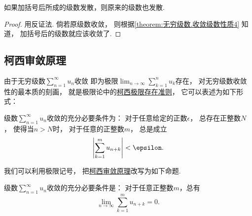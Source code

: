 \begin{corollary}
如果加括号后所成的级数发散，则原来的级数也发散.
\begin{proof}
用反证法.
倘若原级数收敛，
则根据\cref{theorem:无穷级数.收敛级数性质4} 知道，
加括号后的级数就应该收敛了.
\end{proof}
\end{corollary}

\subsection{柯西审敛原理}
由于无穷级数\(\sum_{n=1}^\infty u_n\)收敛
即为极限\(\lim_{n\to\infty} \sum_{k=1}^n u_k\)存在，
对无穷级数收敛性的最本质的刻画，
就是极限论中的\hyperref[theorem:极限.函数的柯西极限存在准则]{柯西极限存在准则}，
它可以表述为如下形式：
\begin{theorem}[柯西审敛原理]\label{theorem:无穷级数.级数的柯西审敛原理}
级数\(\sum_{n=1}^\infty u_n\)收敛的充分必要条件为：
对于任意给定的正数\(\epsilon\)，
总存在正整数\(N\)，
使得当\(n>N\)时，
对于任意的正整数\(m\)，
总是成立\begin{equation*}
	\abs{ \sum_{k=1}^m u_{n+k} }
	< \epsilon.
\end{equation*}
\end{theorem}

我们可以利用极限记号，
把\hyperref[theorem:无穷级数.级数的柯西审敛原理]{柯西审敛原理}改写为如下命题.
\begin{proposition}
级数\(\sum_{n=1}^\infty u_n\)收敛的充分必要条件是：
对于任意正整数\(m\)，总有\begin{equation*}
	\lim_{n\to\infty} \sum_{k=1}^m u_{n+k} = 0.
\end{equation*}
\end{proposition}

